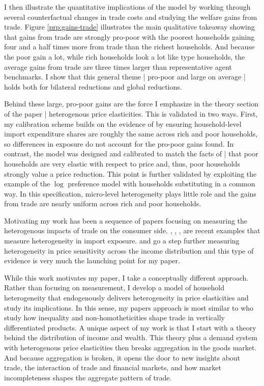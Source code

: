 \documentclass[12pt,pdftex]{article}
\begin{document}
\begin{onehalfspacing}
I then illustrate the quantitative implications of the model by working through several counterfactual changes in trade costs and studying the welfare gains from trade. Figure \ref{prp:gains-trade} illustrates the main qualitative takeaway showing that gains from trade are strongly pro-poor with the poorest households gaining four and a half times more from trade than the richest households. And because the poor gain a lot, while rich households look a lot like \citet{arkolakis2012new} type households, the average gains from trade are three times larger than representative agent benchmarks. I show that this general theme | pro-poor and large on average | holds both for bilateral reductions and global reductions.

Behind these large, pro-poor gains are the force I emphasize in the theory section of the paper | heterogenous price elasticities. This is validated in two ways. First, my calibration scheme builds on the evidence of \citet{borusyak2021distributional} by ensuring household-level import expenditure shares are roughly the same across rich and poor households, so differences in exposure do not account for the pro-poor gains found. In contrast, the model was designed and calibrated to match the facts of \citet*{auer2022unequal} | that poor households are very elastic with respect to price and, thus, poor households strongly value a price reduction. This point is further validated by exploiting the example of the $\log$ preference model with households substituting in a common way. In this specification, micro-level heterogeneity plays little role and the gains from trade are nearly uniform across rich and poor households.

Motivating my work has been a sequence of papers focusing on measuring the heterogenous impacts of trade on the consumer side. \citet{fajgelbaum2016measuring}, \citet{carroll2020heterogeneous}, \citet{borusyak2021distributional}, \citet{jaccardtoronto} are recent examples that measure heterogeneity in import exposure. \citet*{auer2022unequal} and \citet*{colicev2022impact} go a step further measuring heterogeneity in price sensitivity across the income distribution and this type of evidence is very much the launching point for my paper.

While this work motivates my paper, I take a conceptually different approach. Rather than focusing on measurement, I develop a model of household heterogeneity that endogenously delivers heterogeneity in price elasticities and study its implications. In this sense, my papers approach is most similar to \citet*{fajgelbaum2011income} who study how inequality and non-homotheticities shape trade in vertically differentiated products. A unique aspect of my work is that I start with a theory behind the distribution of income and wealth. This theory plus a demand system with heterogenous price elasticities then breaks aggregation in the goods market. And because aggregation is broken, it opens the door to new insights about trade, the interaction of trade and financial markets, and how market incompleteness shapes the aggregate pattern of trade.


\end{onehalfspacing}
\end{document}
